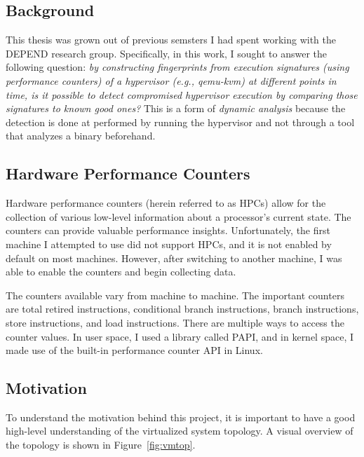 \documentclass[notitlepage]{article}
\begin{document}
\subsection{Background}
This thesis was grown out of previous semsters I had spent working with the
DEPEND research group. Specifically, in this work,  I sought to answer the
following question:
\textit{by constructing fingerprints
    from execution signatures (using performance counters) of a hypervisor
    (e.g., qemu-kvm) at different points in time, is it possible to detect
    compromised hypervisor execution by comparing those signatures to known good ones?} This
    is a form of \textit{dynamic analysis} because the detection is done at
    performed by running the hypervisor and not through a tool that analyzes a
    binary beforehand.

\subsection{Hardware Performance Counters}
Hardware performance counters (herein referred to as HPCs) allow for the
collection of various low-level information about a processor's current state.
The counters can provide valuable performance insights. Unfortunately, the first
machine I attempted to use did not support HPCs, and it is not enabled by
default on most machines.  However, after switching to another machine, I was
able to enable the counters and begin collecting data.

The counters available vary from machine to machine. The important counters are
total retired instructions, conditional branch instructions, branch
instructions, store instructions, and load instructions.  There are multiple
ways to access the counter values. In user space, I used a library called
PAPI\cite{papi}, and in kernel space, I made use of the built-in performance
counter API in Linux.

\subsection{Motivation}
To understand the motivation behind this project, it is important to have a good
high-level understanding of the virtualized system topology. A visual overview
of the topology is shown in Figure~\ref{fig:vmtop}.
\end{document}
